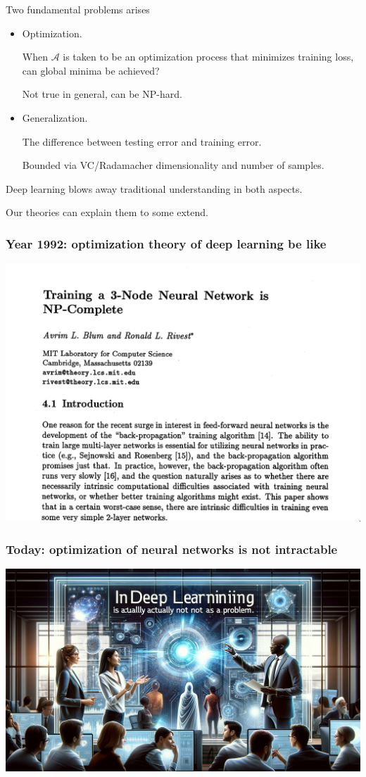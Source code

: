 \documentclass{beamer}   	%
\theoremstyle{definition}
\begin{document}
\begin{frame}
	Two fundamental problems arises
	\begin{itemize}
		\item Optimization.

		When $\mathcal{A}$ is taken to be an optimization process that minimizes training loss, can global minima be achieved?

		Not true in general, can be NP-hard.
		\item Generalization.

		The difference between testing error and training error.

		Bounded via VC/Radamacher dimensionality and number of samples.
	\end{itemize}

	Deep learning blows away traditional understanding in both aspects.

	Our theories can explain them to some extend.
\end{frame}

\begin{frame}
\frametitle{Year 1992: optimization theory of deep learning be like}
\includegraphics[width=\linewidth]{train_nn_is_np_complete.png}
\end{frame}

\begin{frame}
\frametitle{Today: optimization of neural networks is not intractable}
\includegraphics[width=\linewidth]{nn_is_not_a_problem.png}
\end{frame}
\end{document}
